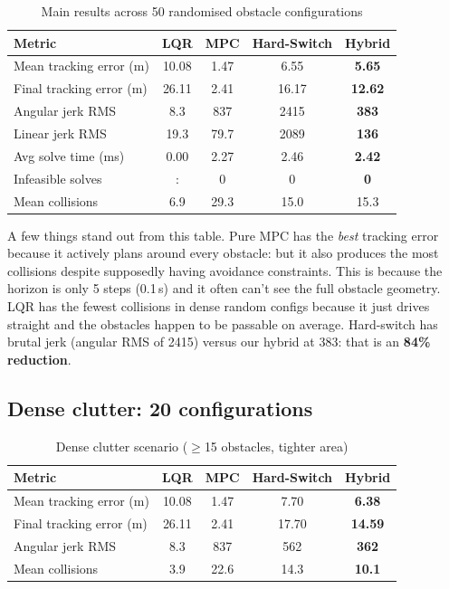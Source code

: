\documentclass[12pt,a4paper]{article}
\begin{document}
\begin{table}[H]
\centering
\caption{Main results across 50 randomised obstacle configurations}
\begin{tabular}{lcccc}
\toprule
\textbf{Metric} & \textbf{LQR} & \textbf{MPC} & \textbf{Hard-Switch} & \textbf{Hybrid} \\
\midrule
Mean tracking error (m)  & 10.08 & 1.47 & 6.55 & \textbf{5.65} \\
Final tracking error (m) & 26.11 & 2.41 & 16.17 & \textbf{12.62} \\
Angular jerk RMS         & 8.3   & 837  & 2415 & \textbf{383} \\
Linear jerk RMS          & 19.3  & 79.7 & 2089 & \textbf{136} \\
Avg solve time (ms)      & 0.00  & 2.27 & 2.46 & \textbf{2.42} \\
Infeasible solves        &:   & 0    & 0    & \textbf{0} \\
Mean collisions          & 6.9   & 29.3 & 15.0 & 15.3 \\
\bottomrule
\end{tabular}
\end{table}

A few things stand out from this table. Pure MPC has the \emph{best}
tracking error because it actively plans around every obstacle: but
it also produces the most collisions despite supposedly having avoidance
constraints. This is because the horizon is only 5 steps (0.1\,s) and it
often can't see the full obstacle geometry. LQR has the fewest collisions
in dense random configs because it just drives straight and the obstacles
happen to be passable on average. Hard-switch has brutal jerk  (angular
RMS of 2415) versus our hybrid at 383: that is an \textbf{84\% reduction}.

\subsection{Dense clutter: 20 configurations}

\begin{table}[H]
\centering
\caption{Dense clutter scenario ($\geq$15 obstacles, tighter area)}
\begin{tabular}{lcccc}
\toprule
\textbf{Metric} & \textbf{LQR} & \textbf{MPC} & \textbf{Hard-Switch} & \textbf{Hybrid} \\
\midrule
Mean tracking error (m)  & 10.08 & 1.47 & 7.70 & \textbf{6.38} \\
Final tracking error (m) & 26.11 & 2.41 & 17.70 & \textbf{14.59} \\
Angular jerk RMS         & 8.3   & 837  & 562  & \textbf{362} \\
Mean collisions          & 3.9   & 22.6 & 14.3 & \textbf{10.1} \\
\bottomrule
\end{tabular}
\end{table}
\end{document}
